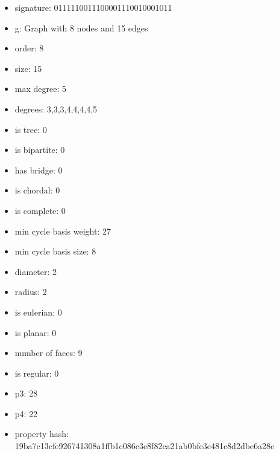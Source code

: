 \begin{itemize}
\item signature: 0111110011100001110010001011
\item g: Graph with 8 nodes and 15 edges
\item order: 8
\item size: 15
\item max degree: 5
\item degrees: 3,3,3,4,4,4,4,5
\item is tree: 0
\item is bipartite: 0
\item has bridge: 0
\item is chordal: 0
\item is complete: 0
\item min cycle basis weight: 27
\item min cycle basis size: 8
\item diameter: 2
\item radius: 2
\item is eulerian: 0
\item is planar: 0
\item number of faces: 9
\item is regular: 0
\item p3: 28
\item p4: 22
\item property hash: 19ba7c13cfe926741308a1ffb1c086c3e8f82ca21ab0bfe3e481c8d2dbe6a28e
\end{itemize}
\newpage
\begin{figure}
\end{figure}
